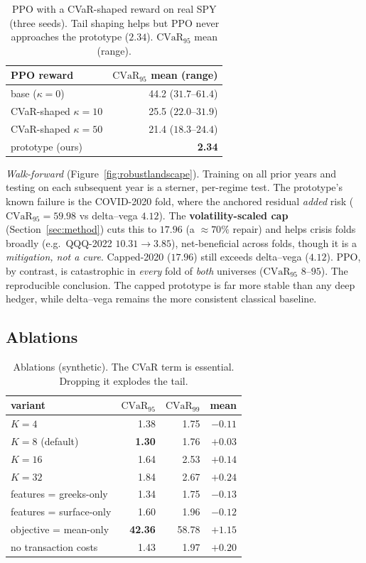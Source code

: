 \documentclass[sigconf,anonymous]{acmart}
\begin{document}
\begin{table}[t]
\centering
\caption{PPO with a CVaR-shaped reward on real SPY (three seeds). Tail shaping
helps but PPO never approaches the prototype ($2.34$). $\mathrm{CVaR}_{95}$
mean (range).}
\label{tab:ppokappa}
\small
\begin{tabular}{lr}
\toprule
PPO reward & $\mathrm{CVaR}_{95}$ mean (range) \\
\midrule
base ($\kappa=0$)        & 44.2 ($31.7$--$61.4$) \\
CVaR-shaped $\kappa=10$  & 25.5 ($22.0$--$31.9$) \\
CVaR-shaped $\kappa=50$  & 21.4 ($18.3$--$24.4$) \\
\midrule
prototype (ours)         & \textbf{2.34} \\
\bottomrule
\end{tabular}
\end{table} \emph{Walk-forward}
(Figure~\ref{fig:robustlandscape}). Training on all prior years and testing on each
subsequent year is a sterner, per-regime test. The prototype's known failure is the
COVID-2020 fold, where the anchored residual \emph{added} risk
($\mathrm{CVaR}_{95}=59.98$ vs delta--vega $4.12$). The \textbf{volatility-scaled
cap} (Section~\ref{sec:method}) cuts this to $17.96$ (a ${\approx}70\%$ repair) and
helps crisis folds broadly (e.g.\ QQQ-2022 $10.31\to3.85$), net-beneficial across
folds, though it is a \emph{mitigation, not a cure}. Capped-2020 ($17.96$) still
exceeds delta--vega ($4.12$). PPO, by contrast, is catastrophic in \emph{every} fold
of \emph{both} universes ($\mathrm{CVaR}_{95}$ $8$--$95$). The reproducible
conclusion. The capped prototype is far more stable than any deep hedger, while
delta--vega remains the more consistent classical baseline.

\subsection{Ablations}

\begin{table}[t]
\centering
\caption{Ablations (synthetic). The CVaR term is essential. Dropping it explodes
the tail.}
\label{tab:ablation}
\small
\begin{tabular}{lrrr}
\toprule
variant & $\mathrm{CVaR}_{95}$ & $\mathrm{CVaR}_{99}$ & mean \\
\midrule
$K=4$                 & 1.38 & 1.75 & $-0.11$ \\
$K=8$ (default)       & \textbf{1.30} & 1.76 & $+0.03$ \\
$K=16$                & 1.64 & 2.53 & $+0.14$ \\
$K=32$                & 1.84 & 2.67 & $+0.24$ \\
features = greeks-only  & 1.34 & 1.75 & $-0.13$ \\
features = surface-only & 1.60 & 1.96 & $-0.12$ \\
objective = mean-only   & \textbf{42.36} & 58.78 & $+1.15$ \\
no transaction costs    & 1.43 & 1.97 & $+0.20$ \\
\bottomrule
\end{tabular}
\end{table}
\end{document}
